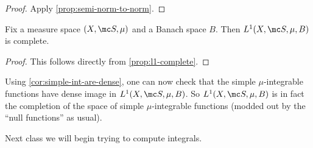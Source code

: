 \documentclass[../notes.tex]{subfiles}
\begin{document}
\begin{proof}
	Apply \autoref{prop:semi-norm-to-norm}.
\end{proof}
\begin{corollary} \label{cor:l1-complete}
	Fix a measure space $(X,\mc S,\mu)$ and a Banach space $B$. Then $L^1(X,\mc S,\mu,B)$ is complete.
\end{corollary}
\begin{proof}
	This follows directly from \autoref{prop:l1-complete}.
\end{proof}
\begin{remark}
	Using \autoref{cor:simple-int-are-dense}, one can now check that the simple $\mu$-integrable functions have dense image in $L^1(X,\mc S,\mu,B)$. So $L^1(X,\mc S,\mu,B)$ is in fact the completion of the space of simple $\mu$-integrable functions (modded out by the ``null functions'' as usual).
\end{remark}
Next class we will begin trying to compute integrals.
\end{document}
